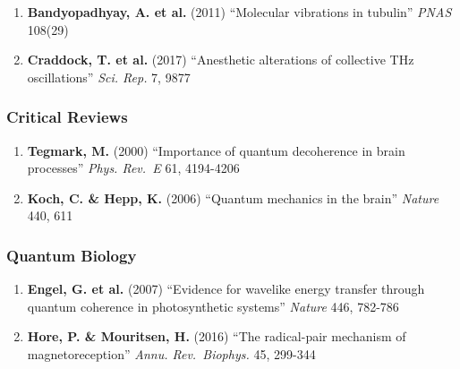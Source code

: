 \begin{enumerate}
\def\labelenumi{\arabic{enumi}.}
\setcounter{enumi}{3}
\tightlist
\item
  \textbf{Bandyopadhyay, A. et al.} (2011) ``Molecular vibrations in
  tubulin'' \emph{PNAS} 108(29)
\item
  \textbf{Craddock, T. et al.} (2017) ``Anesthetic alterations of
  collective THz oscillations'' \emph{Sci. Rep.} 7, 9877
\end{enumerate}

\subsubsection{Critical Reviews}\label{critical-reviews}

\begin{enumerate}
\def\labelenumi{\arabic{enumi}.}
\setcounter{enumi}{5}
\tightlist
\item
  \textbf{Tegmark, M.} (2000) ``Importance of quantum decoherence in
  brain processes'' \emph{Phys. Rev.~E} 61, 4194-4206
\item
  \textbf{Koch, C. \& Hepp, K.} (2006) ``Quantum mechanics in the
  brain'' \emph{Nature} 440, 611
\end{enumerate}

\subsubsection{Quantum Biology}\label{quantum-biology}

\begin{enumerate}
\def\labelenumi{\arabic{enumi}.}
\setcounter{enumi}{7}
\tightlist
\item
  \textbf{Engel, G. et al.} (2007) ``Evidence for wavelike energy
  transfer through quantum coherence in photosynthetic systems''
  \emph{Nature} 446, 782-786
\item
  \textbf{Hore, P. \& Mouritsen, H.} (2016) ``The radical-pair mechanism
  of magnetoreception'' \emph{Annu. Rev.~Biophys.} 45, 299-344
\end{enumerate}
